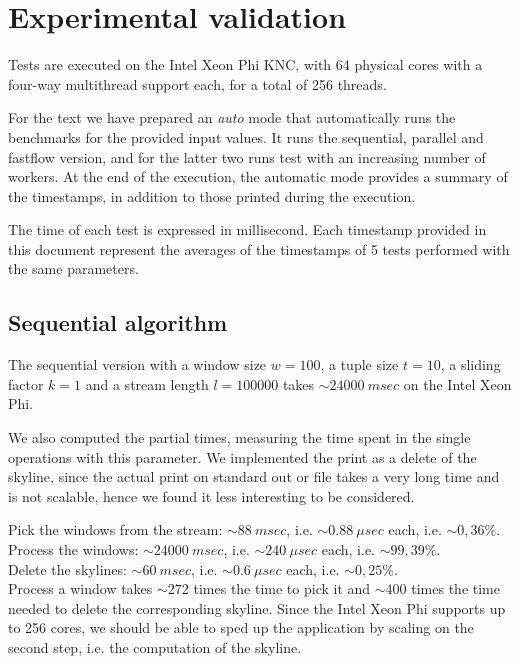 \section{Experimental validation}
Tests are executed on the Intel Xeon Phi KNC, with 64 physical cores with a four-way multithread support each, for a total of 256 threads.

For the text we have prepared an \textit{auto} mode that automatically runs the benchmarks for the provided input values. It runs the sequential, parallel and fastflow version, and for the latter two runs test with an increasing number of workers. At the end of the execution, the automatic mode provides a summary of the timestamps, in addition to those printed during the execution.

The time of each test is expressed in millisecond. Each timestamp provided in this document represent the averages of the timestamps of 5 tests performed with the same parameters.



\subsection{Sequential algorithm}
The sequential version with a window size $w = 100$, a tuple size $t = 10$, a sliding factor $k = 1$ and a stream length $l = 100000$ takes $\sim 24000 \ msec$ on the Intel Xeon Phi.

\bigskip\noindent
We also computed the partial times, measuring the time spent in the single operations with this parameter. We implemented the print as a delete of the skyline, since the actual print on standard out or file takes a very long time and is not scalable, hence we found it less interesting to be considered.

\medskip\noindent
Pick the windows from the stream: $\sim 88 \ msec$, i.e. $\sim 0.88 \ \mu sec$ each, i.e. $\sim 0,36\%$.\\
Process the windows: $\sim 24000 \ msec$, i.e. $\sim 240 \ \mu sec$ each, i.e. $\sim 99,39\%$.\\
Delete the skylines: $\sim 60 \ msec$, i.e. $\sim 0.6 \ \mu sec$ each, i.e. $\sim 0,25\%$.\\

\bigskip\noindent
Process a window takes $\sim 272$ times the time to pick it and $\sim 400$ times the time needed to delete the corresponding skyline. Since the Intel Xeon Phi supports up to 256 cores, we should be able to sped up the application by scaling on the second step, i.e. the computation of the skyline.



